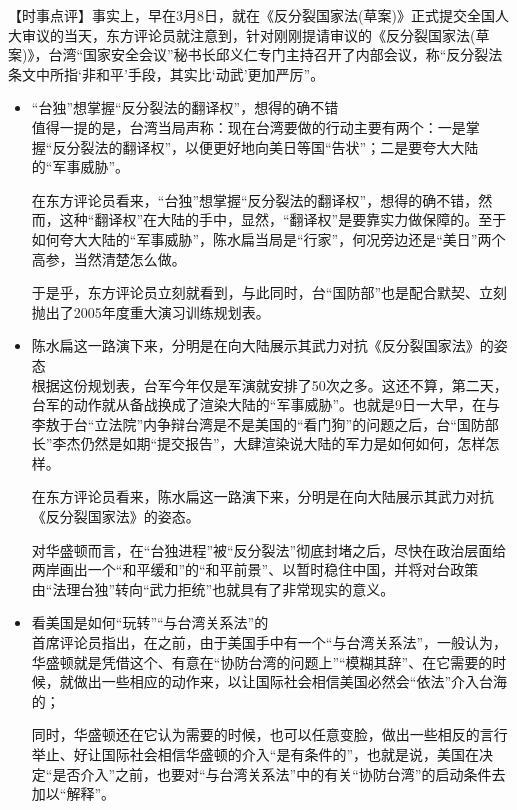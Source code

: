 \documentclass[a4paper,11pt]{article}
\begin{document}
\begin{itemize}
   【时事点评】事实上，早在3月8日，就在《反分裂国家法(草案)》正式提交全国人大审议的当天，东方评论员就注意到，针对刚刚提请审议的《反分裂国家法(草案)》，台湾“国家安全会议”秘书长邱义仁专门主持召开了内部会议，称“反分裂法条文中所指‘非和平’手段，其实比‘动武’更加严厉”。
 
\begin{itemize}

\item “台独”想掌握“反分裂法的翻译权”，想得的确不错\\
\label{sec-3_2_1}%
值得一提的是，台湾当局声称：现在台湾要做的行动主要有两个：一是掌握“反分裂法的翻译权”，以便更好地向美日等国“告状”；二是要夸大大陆的“军事威胁”。

    在东方评论员看来，“台独”想掌握“反分裂法的翻译权”，想得的确不错，然而，这种“翻译权”在大陆的手中，显然，“翻译权”是要靠实力做保障的。至于如何夸大大陆的“军事威胁”，陈水扁当局是“行家”，何况旁边还是“美日”两个高参，当然清楚怎么做。

    于是乎，东方评论员立刻就看到，与此同时，台“国防部”也是配合默契、立刻抛出了2005年度重大演习训练规划表。
 

\item 陈水扁这一路演下来，分明是在向大陆展示其武力对抗《反分裂国家法》的姿态\\
\label{sec-3_2_2}%
根据这份规划表，台军今年仅是军演就安排了50次之多。这还不算，第二天，台军的动作就从备战换成了渲染大陆的“军事威胁”。也就是9日一大早，在与李敖于台“立法院”内争辩台湾是不是美国的“看门狗”的问题之后，台“国防部长”李杰仍然是如期“提交报告”，大肆渲染说大陆的军力是如何如何，怎样怎样。

    在东方评论员看来，陈水扁这一路演下来，分明是在向大陆展示其武力对抗《反分裂国家法》的姿态。

    对华盛顿而言，在“台独进程”被“反分裂法”彻底封堵之后，尽快在政治层面给两岸画出一个“和平缓和”的“和平前景”、以暂时稳住中国，并将对台政策由“法理台独”转向“武力拒统”也就具有了非常现实的意义。
 

\item 看美国是如何“玩转”“与台湾关系法”的\\
\label{sec-3_2_3}%
首席评论员指出，在之前，由于美国手中有一个“与台湾关系法”，一般认为，华盛顿就是凭借这个、有意在“协防台湾的问题上”“模糊其辞”、在它需要的时候，就做出一些相应的动作来，以让国际社会相信美国必然会“依法”介入台海的；

    同时，华盛顿还在它认为需要的时候，也可以任意变脸，做出一些相反的言行举止、好让国际社会相信华盛顿的介入“是有条件的”，也就是说，美国在决定“是否介入”之前，也要对“与台湾关系法”中的有关“协防台湾”的启动条件去加以“解释”。
 


\end{itemize}
\end{itemize}
\end{document}

